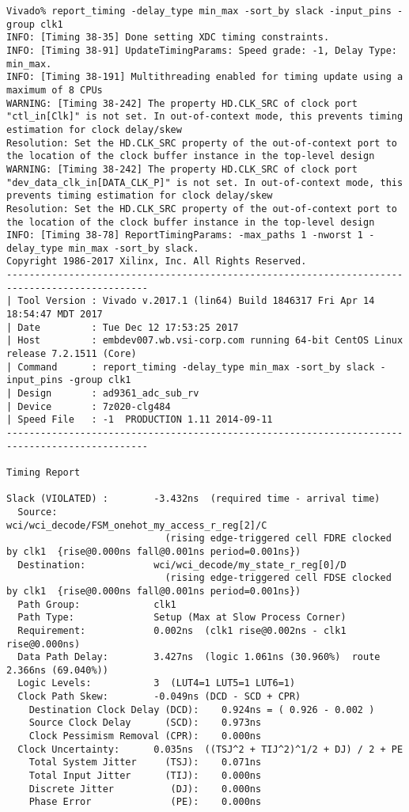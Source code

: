 \documentclass{article}
\begin{document}
\begin{lstlisting}
Vivado% report_timing -delay_type min_max -sort_by slack -input_pins -group clk1
INFO: [Timing 38-35] Done setting XDC timing constraints.
INFO: [Timing 38-91] UpdateTimingParams: Speed grade: -1, Delay Type: min_max.
INFO: [Timing 38-191] Multithreading enabled for timing update using a maximum of 8 CPUs
WARNING: [Timing 38-242] The property HD.CLK_SRC of clock port "ctl_in[Clk]" is not set. In out-of-context mode, this prevents timing estimation for clock delay/skew
Resolution: Set the HD.CLK_SRC property of the out-of-context port to the location of the clock buffer instance in the top-level design
WARNING: [Timing 38-242] The property HD.CLK_SRC of clock port "dev_data_clk_in[DATA_CLK_P]" is not set. In out-of-context mode, this prevents timing estimation for clock delay/skew
Resolution: Set the HD.CLK_SRC property of the out-of-context port to the location of the clock buffer instance in the top-level design
INFO: [Timing 38-78] ReportTimingParams: -max_paths 1 -nworst 1 -delay_type min_max -sort_by slack.
Copyright 1986-2017 Xilinx, Inc. All Rights Reserved.
-----------------------------------------------------------------------------------------------
| Tool Version : Vivado v.2017.1 (lin64) Build 1846317 Fri Apr 14 18:54:47 MDT 2017
| Date         : Tue Dec 12 17:53:25 2017
| Host         : embdev007.wb.vsi-corp.com running 64-bit CentOS Linux release 7.2.1511 (Core)
| Command      : report_timing -delay_type min_max -sort_by slack -input_pins -group clk1
| Design       : ad9361_adc_sub_rv
| Device       : 7z020-clg484
| Speed File   : -1  PRODUCTION 1.11 2014-09-11
-----------------------------------------------------------------------------------------------

Timing Report

Slack (VIOLATED) :        -3.432ns  (required time - arrival time)
  Source:                 wci/wci_decode/FSM_onehot_my_access_r_reg[2]/C
                            (rising edge-triggered cell FDRE clocked by clk1  {rise@0.000ns fall@0.001ns period=0.001ns})
  Destination:            wci/wci_decode/my_state_r_reg[0]/D
                            (rising edge-triggered cell FDSE clocked by clk1  {rise@0.000ns fall@0.001ns period=0.001ns})
  Path Group:             clk1
  Path Type:              Setup (Max at Slow Process Corner)
  Requirement:            0.002ns  (clk1 rise@0.002ns - clk1 rise@0.000ns)
  Data Path Delay:        3.427ns  (logic 1.061ns (30.960%)  route 2.366ns (69.040%))
  Logic Levels:           3  (LUT4=1 LUT5=1 LUT6=1)
  Clock Path Skew:        -0.049ns (DCD - SCD + CPR)
    Destination Clock Delay (DCD):    0.924ns = ( 0.926 - 0.002 ) 
    Source Clock Delay      (SCD):    0.973ns
    Clock Pessimism Removal (CPR):    0.000ns
  Clock Uncertainty:      0.035ns  ((TSJ^2 + TIJ^2)^1/2 + DJ) / 2 + PE
    Total System Jitter     (TSJ):    0.071ns
    Total Input Jitter      (TIJ):    0.000ns
    Discrete Jitter          (DJ):    0.000ns
    Phase Error              (PE):    0.000ns


\end{lstlisting}
\end{document}
